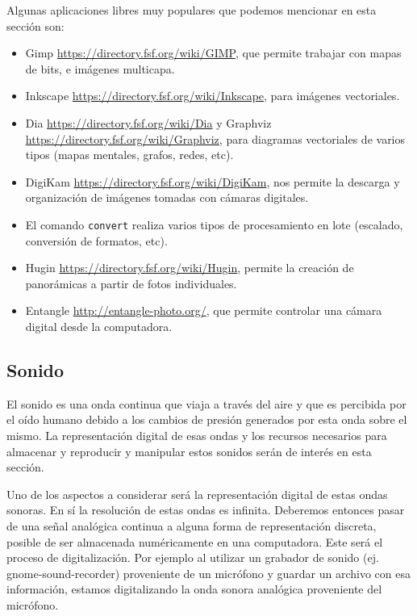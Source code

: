 \documentclass[12pt]{article}
\begin{document}
Algunas aplicaciones libres muy populares que podemos mencionar en esta sección son: 
\begin{itemize}
\item Gimp \url{https://directory.fsf.org/wiki/GIMP}, que permite 
trabajar con mapas de bits, e imágenes multicapa. 
\item Inkscape \url{https://directory.fsf.org/wiki/Inkscape}, 
para imágenes vectoriales. 
\item Dia \url{https://directory.fsf.org/wiki/Dia} y Graphviz 
\url{https://directory.fsf.org/wiki/Graphviz}, para diagramas vectoriales de 
varios tipos (mapas mentales, grafos, redes, etc). 
\item DigiKam \url{https://directory.fsf.org/wiki/DigiKam}, nos permite la descarga y organización de 
imágenes tomadas con cámaras digitales. 
\item El comando {\tt convert} realiza varios tipos de procesamiento
en lote (escalado, conversión de formatos, etc). 
\item Hugin \url{https://directory.fsf.org/wiki/Hugin},  
permite la creación de panorámicas a partir de fotos individuales.  
\item Entangle \url{http://entangle-photo.org/}, que permite controlar una cámara 
digital desde la computadora.
\end{itemize}


 
\subsection*{Sonido}

El sonido es una onda continua que viaja a través del aire y que es percibida por el 
oído humano debido a los cambios de presión generados por esta onda sobre el mismo. 
La representación digital de esas ondas y los recursos necesarios para almacenar y 
reproducir y manipular estos sonidos serán de interés en esta sección. 

Uno de los aspectos a considerar será la representación digital de estas ondas sonoras. 
En sí la resolución de estas ondas es infinita. Deberemos entonces pasar de una 
señal analógica continua a alguna forma de representación discreta, posible de ser  
almacenada numéricamente en una computadora. Este será el proceso de digitalización. 
Por ejemplo al utilizar un grabador de sonido (ej. gnome-sound-recorder) proveniente 
de un micrófono y guardar un archivo con esa información, estamos digitalizando la 
onda sonora analógica proveniente del micrófono. 
\end{document}
